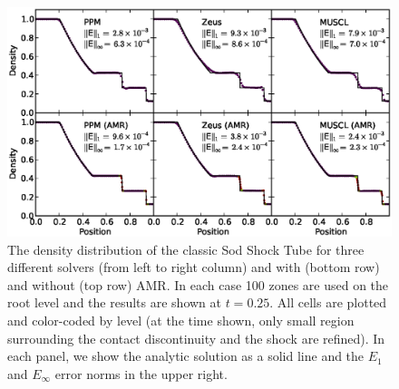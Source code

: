 \begin{figure}
\begin{center}
\includegraphics[width=\textwidth]{figures/SodShockTube.eps}
\caption{The density distribution of the classic Sod Shock Tube for
three different solvers (from left to right column) and with (bottom
row) and without (top row) AMR.  In each case 100 zones are used on
the root level and the results are shown at $t=0.25$.  All cells are
plotted and color-coded by level (at the time shown, only small region
surrounding the contact discontinuity and the shock are refined).  In
each panel, we show the analytic solution as a solid line and the $E_1$
and $E_\infty$ error norms in the upper right.}
\label{fig.sodshocktube}
\end{center}
\end{figure}


